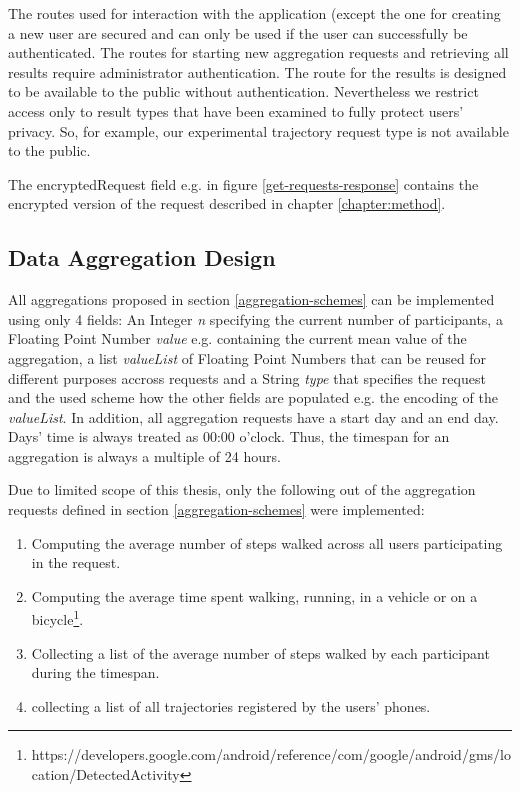 
The routes used for interaction with the application (except the one for creating a new user are secured and can only be used if the user can successfully be authenticated. The routes for starting new aggregation requests and retrieving all results require administrator authentication. The route for the results is designed to be available to the public without authentication. Nevertheless we restrict access only to result types that have been examined to fully protect users' privacy. So, for example, our experimental trajectory request type is not available to the public.

The encryptedRequest field e.g. in figure \ref{get-requests-response} contains the encrypted version of the request described in chapter \ref{chapter:method}.

\subsection{Data Aggregation Design}
All aggregations proposed in section \ref{aggregation-schemes} can be implemented using only 4 fields: An Integer \textit{n} specifying the current number of participants, a Floating Point Number \textit{value} e.g. containing the current mean value of the aggregation, a list \textit{valueList} of Floating Point Numbers that can be reused for different purposes accross requests and a String \textit{type} that specifies the request and the used scheme how the other fields are populated e.g. the encoding of the \textit{valueList}. In addition, all aggregation requests have a start day and an end day. Days' time is always treated as 00:00 o'clock. Thus, the timespan for an aggregation is always a multiple of 24 hours.\\

\begin{samepage}
Due to limited scope of this thesis, only the following out of the aggregation requests defined in section \ref{aggregation-schemes} were implemented:
\begin{enumerate}
	\item Computing the average number of steps walked across all users participating in the request.
	\item Computing the average time spent walking, running, in a vehicle or on a bicycle\footnote{https://developers.google.com/android/reference/com/google/android/gms/location/DetectedActivity}.
	\item Collecting a list of the average number of steps walked by each participant during the timespan.
	\item collecting a list of all trajectories registered by the users' phones.
\end{enumerate}
\end{samepage}

